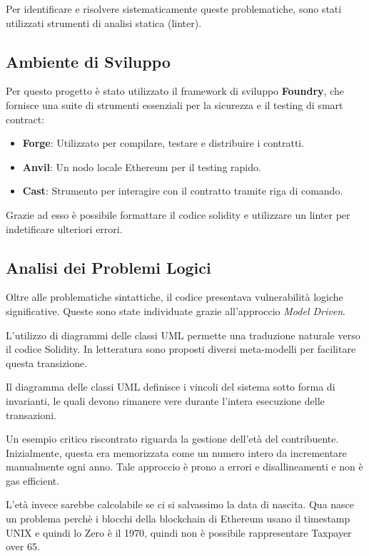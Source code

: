 \documentclass[conference]{IEEEtran}
\begin{document}
Per identificare e risolvere sistematicamente queste problematiche, sono stati utilizzati strumenti di analisi statica (linter).

\subsection{Ambiente di Sviluppo}

Per questo progetto è stato utilizzato il framework di sviluppo \textbf{Foundry}, che fornisce una suite di strumenti essenziali per la sicurezza e il testing di smart contract:

\begin{itemize}
	\item \textbf{Forge}: Utilizzato per compilare, testare e distribuire i contratti.
	\item \textbf{Anvil}: Un nodo locale Ethereum per il testing rapido.
	\item \textbf{Cast}: Strumento per interagire con il contratto tramite riga di comando.
\end{itemize}

Grazie ad esso è possibile formattare il codice solidity e utilizzare un linter per indetificare ulteriori errori.

\subsection{Analisi dei Problemi Logici}

Oltre alle problematiche sintattiche, il codice presentava vulnerabilità logiche significative. Queste sono state individuate grazie all'approccio \textit{Model Driven}.

L'utilizzo di diagrammi delle classi UML permette una traduzione naturale verso il codice Solidity. In letteratura %
sono proposti diversi meta-modelli per facilitare questa transizione.

Il diagramma delle classi UML definisce i vincoli del sistema sotto forma di invarianti, le quali devono rimanere vere durante l'intera esecuzione delle transazioni.

Un esempio critico riscontrato riguarda la gestione dell'età del contribuente. Inizialmente, questa era memorizzata come un numero intero da incrementare manualmente ogni anno.
Tale approccio è prono a errori e disallineamenti e non è gas efficient.

L'età invece sarebbe calcolabile se ci si salvassimo la data di nascita. Qua nasce un problema perchè i blocchi della blockchain di Ethereum usano il timestamp
UNIX e quindi lo Zero è il 1970, quindi non è possibile rappresentare Taxpayer over 65.
\end{document}
